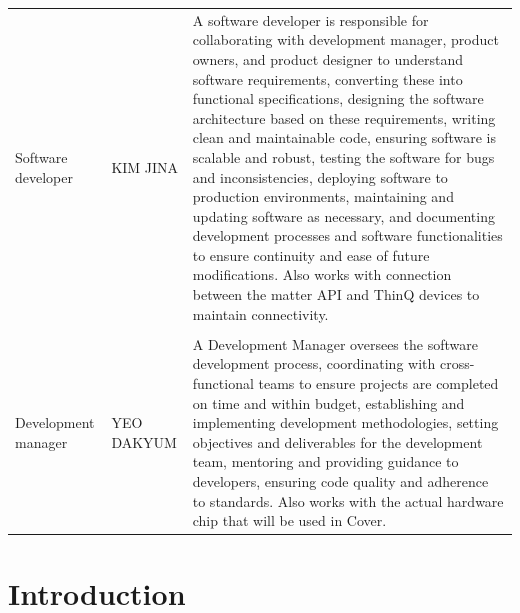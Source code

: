 \documentclass[conference]{IEEEtran}
\begin{document}
\begin{table}[H]
\center
\begin{tabular}{m{1.7cm} m{1.4cm} m{3.8cm}}
\midrule
Software developer & KIM JINA & A software developer is responsible for collaborating with development manager, product owners, and product designer to understand software requirements, converting these into functional specifications, designing the software architecture based on these requirements, writing clean and maintainable code, ensuring software is scalable and robust, testing the software for bugs and inconsistencies, deploying software to production environments, maintaining and updating software as necessary, and documenting development processes and software functionalities to ensure continuity and ease of future modifications. Also works with connection between the matter API and ThinQ devices to maintain connectivity.\\\\
Development manager & YEO DAKYUM & A Development Manager oversees the software development process, coordinating with cross-functional teams to ensure projects are completed on time and within budget, establishing and implementing development methodologies, setting objectives and deliverables for the development team, mentoring and providing guidance to developers, ensuring code quality and adherence to standards. Also works with the actual hardware chip that will be used in Cover.\\
\bottomrule
\end{tabular}
\end{table}

\section{\large{Introduction}}
\end{document}
